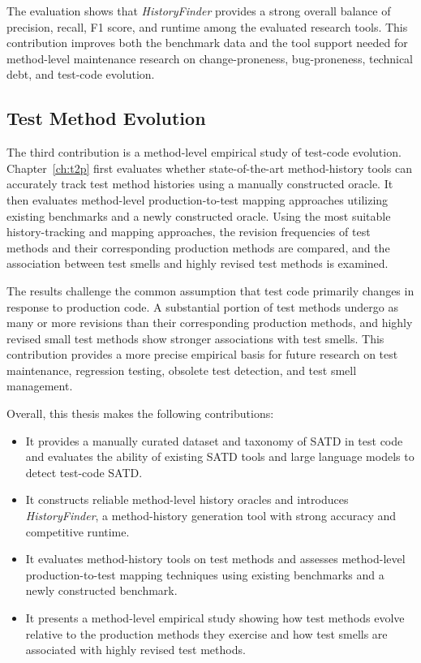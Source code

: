 The evaluation shows that \textit{HistoryFinder} provides a strong overall balance of precision, recall, F1 score, and runtime among the evaluated research tools. This contribution improves both the benchmark data and the tool support needed for method-level maintenance research on change-proneness, bug-proneness, technical debt, and test-code evolution.

\subsection{Test Method Evolution}

The third contribution is a method-level empirical study of test-code evolution. Chapter~\ref{ch:t2p} first evaluates whether state-of-the-art method-history tools can accurately track test method histories using a manually constructed oracle. It then evaluates method-level production-to-test mapping approaches utilizing existing benchmarks and a newly constructed oracle. Using the most suitable history-tracking and mapping approaches, the revision frequencies of test methods and their corresponding production methods are compared, and the association between test smells and highly revised test methods is examined.

The results challenge the common assumption that test code primarily changes in response to production code. A substantial portion of test methods undergo as many or more revisions than their corresponding production methods, and highly revised small test methods show stronger associations with test smells. This contribution provides a more precise empirical basis for future research on test maintenance, regression testing, obsolete test detection, and test smell management.

Overall, this thesis makes the following contributions:

\begin{itemize}
\item It provides a manually curated dataset and taxonomy of SATD in test code and evaluates the ability of existing SATD tools and large language models to detect test-code SATD.
\item It constructs reliable method-level history oracles and introduces \textit{HistoryFinder}, a method-history generation tool with strong accuracy and competitive runtime.
\item It evaluates method-history tools on test methods and assesses method-level production-to-test mapping techniques using existing benchmarks and a newly constructed benchmark.
\item It presents a method-level empirical study showing how test methods evolve relative to the production methods they exercise and how test smells are associated with highly revised test methods.
\end{itemize}

